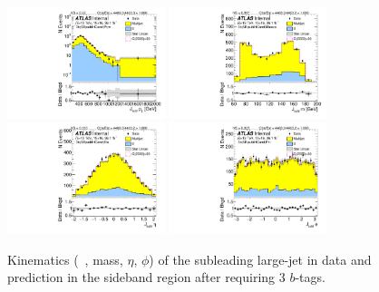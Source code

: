 \begin{figure}[htb!]
\begin{center}
\includegraphics[width=0.41\textwidth,angle=-90]{figures/boosted/Sideband/b77_ThreeTag_Sideband_sublHCand_Pt_m_1.pdf}
\includegraphics[width=0.41\textwidth,angle=-90]{figures/boosted/Sideband/b77_ThreeTag_Sideband_sublHCand_Mass_s.pdf}\\
\includegraphics[width=0.41\textwidth,angle=-90]{figures/boosted/Sideband/b77_ThreeTag_Sideband_sublHCand_Eta.pdf}
\includegraphics[width=0.41\textwidth,angle=-90]{figures/boosted/Sideband/b77_ThreeTag_Sideband_sublHCand_Phi.pdf}
  \caption{Kinematics (\pt~, mass, $\eta$, $\phi$) of the subleading large-\R jet in data and prediction in the sideband region after requiring 3 $b$-tags.}
  \label{fig:boosted-3b-sideband-ak10-subl}
\end{center}
\end{figure}

